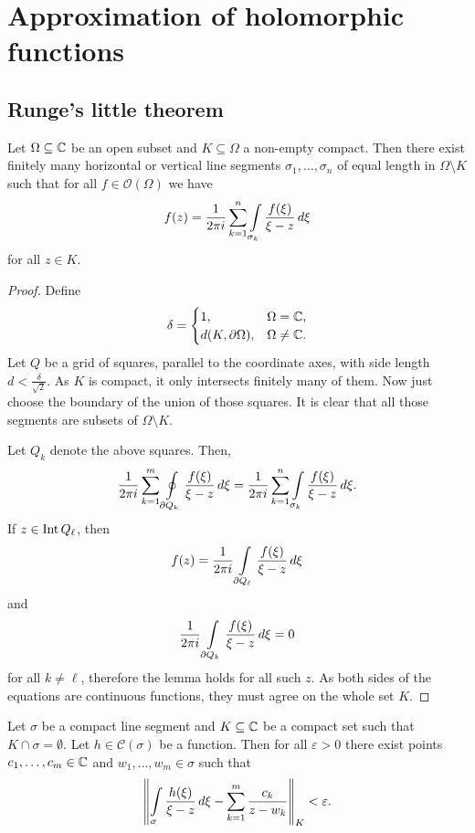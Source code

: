 \section{Approximation of holomorphic functions}

\subsection{Runge's little theorem}


\begin{lema}\label{app:lm:seg}
Let $\Omega \subseteq \mathbb{C}$ be an open subset and
$K \subseteq \Omega$ a non-empty compact. Then there exist finitely
many horizontal or vertical line segments
$\sigma_1, \dots, \sigma_n$ of equal length in
$\Omega \setminus K$ such that for all $f \in \mathcal{O}(\Omega)$
we have
\[
f(z) = \frac{1}{2 \pi i} \sum_{k=1}^n
\int\limits_{\sigma_k} \frac{f(\xi)}{\xi - z}\,d\xi
\]
for all $z \in K$.
\end{lema}

\begin{proof}
Define
\[
\delta =
\begin{cases}
          1,           & \Omega = \mathbb{C},   \\
d(K, \partial \Omega), & \Omega \ne \mathbb{C}.
\end{cases}
\]
Let $Q$ be a grid of squares, parallel to the coordinate axes, with
side length $d < \frac{\delta}{\sqrt{2}}$. As $K$ is compact, it
only intersects finitely many of them. Now just choose the boundary
of the union of those squares. It is clear that all those segments
are subsets of $\Omega \setminus K$.

Let $Q_k$ denote the above squares. Then,
\[
\frac{1}{2 \pi i} \sum_{k=1}^m \oint\limits_{\partial Q_k}
\frac{f(\xi)}{\xi - z}\,d\xi =
\frac{1}{2 \pi i} \sum_{k=1}^n \int\limits_{\sigma_k}
\frac{f(\xi)}{\xi - z}\,d\xi.
\]
If $z \in \operatorname{Int} Q_\ell$, then
\[
f(z) =
\frac{1}{2 \pi i} \int\limits_{\partial Q_\ell}
\frac{f(\xi)}{\xi - z}\,d\xi
\]
and
\[
\frac{1}{2 \pi i} \int\limits_{\partial Q_k}
\frac{f(\xi)}{\xi - z}\,d\xi = 0
\]
for all $k \ne \ell$, therefore the lemma holds for all such $z$.
As both sides of the equations are continuous functions, they must
agree on the whole set $K$.
\end{proof}

\begin{lema}\label{app:lm:app_seg}
Let $\sigma$ be a compact line segment and $K \subseteq \mathbb{C}$ be a
compact set such that $K \cap \sigma = \emptyset$. Let
$h \in \mathcal{C}(\sigma)$ be a function. Then for all
$\varepsilon > 0$ there exist points $c_1, \dots, c_m \in \mathbb{C}$ and
$w_1, \dots, w_m \in \sigma$ such that
\[
\left\lVert \int\limits_\sigma \frac{h(\xi)}{\xi - z}\,d\xi -
\sum_{k=1}^m \frac{c_k}{z - w_k}\right\rVert_K <
\varepsilon.
\]
\end{lema}

